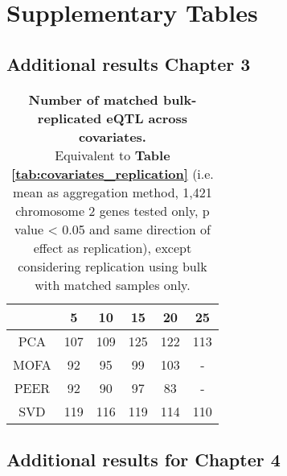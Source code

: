 \chapter{Supplementary Tables} 

\section{Additional results Chapter 3}

\begin{table}[h]
    \centering
    \begin{tabular}{c|c c c c c}
    &       5 & 10 & 15 & 20 & 25  \\
    \hline
    PCA   & 107 & 109 &  125 & 122 & 113 \\
    MOFA  &  92 &  95 &   99 & 103 & -   \\
    PEER  &  92 &  90 &   97 &  83 & -   \\
    SVD   & 119 & 116 &  119 & 114 & 110 \\
    \end{tabular}
    \caption[Covariate comparison in terms of replication of matched bulk results]{\textbf{Number of matched bulk-replicated eQTL across covariates.} \\
    Equivalent to \textbf{Table \ref{tab:covariates_replication}} (i.e. mean as aggregation method, 1,421 chromosome 2 genes tested only, p value < 0.05 and same direction of effect as replication), except considering replication using bulk with matched samples only.}
    \label{tab:covariates_replication_matched_bulk}
\end{table}

\newpage

\section{Additional results for Chapter 4}

